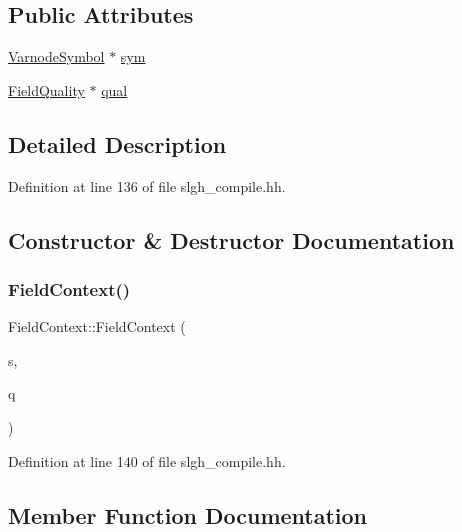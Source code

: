 \subsection*{Public Attributes}
\begin{DoxyCompactItemize}
\item 
\mbox{\hyperlink{class_varnode_symbol}{Varnode\+Symbol}} $\ast$ \mbox{\hyperlink{struct_field_context_aa55ff9eea0294c8f0d7fe47189975174}{sym}}
\item 
\mbox{\hyperlink{struct_field_quality}{Field\+Quality}} $\ast$ \mbox{\hyperlink{struct_field_context_aaae0dff4c44f91251e2e67af5b82376b}{qual}}
\end{DoxyCompactItemize}


\subsection{Detailed Description}


Definition at line 136 of file slgh\+\_\+compile.\+hh.



\subsection{Constructor \& Destructor Documentation}
\mbox{\label{struct_field_context_a33f36afcd6333bc7d2c163322d345282}} 
\subsubsection{\texorpdfstring{FieldContext()}{FieldContext()}}
{\footnotesize\ttfamily Field\+Context\+::\+Field\+Context (\begin{DoxyParamCaption}\item[{\mbox{\hyperlink{class_varnode_symbol}{Varnode\+Symbol}} $\ast$}]{s,  }\item[{\mbox{\hyperlink{struct_field_quality}{Field\+Quality}} $\ast$}]{q }\end{DoxyParamCaption})\hspace{0.3cm}{\ttfamily [inline]}}



Definition at line 140 of file slgh\+\_\+compile.\+hh.



\subsection{Member Function Documentation}
\mbox{\label{struct_field_context_a54651b3da2cdfea0a6dae7cba6404a8b}} 

